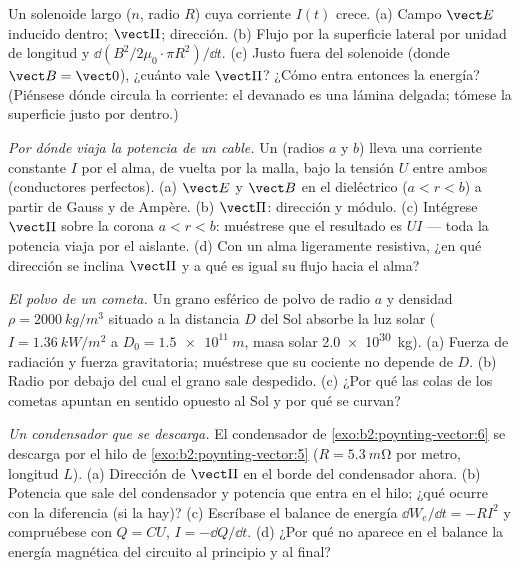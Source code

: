 \begin{exercise}[$\star\star$]\label{exo:b2:poynting-vector:7}
Un solenoide largo ($n$, radio $R$) cuya corriente $I(t)$ crece. (a)
Campo $\vect E$ inducido dentro; $\vect\Pi$; dirección. (b) Flujo por la
superficie lateral por unidad de longitud y $\dd(B^2/2\mu_0\cdot\pi R^2)/\dd t$. (c)
Justo fuera del solenoide (donde $\vect B = \vect 0$), ¿cuánto vale $\vect\Pi$?
¿Cómo entra entonces la energía? (Piénsese dónde circula la corriente: el
devanado es una lámina delgada; tómese la superficie justo por dentro.)
\end{exercise}

\begin{exercise}[$\star\star$]\label{exo:b2:poynting-vector:8}
\emph{Por dónde viaja la potencia de un cable.} Un  (radios $a$
y $b$) lleva una corriente constante $I$ por el alma, de vuelta por la
malla, bajo la tensión $U$ entre ambos (conductores perfectos). (a) $\vect E$ y $\vect B$
en el dieléctrico ($a < r < b$) a partir de Gauss y de Ampère. (b) $\vect\Pi$:
dirección y módulo. (c) Intégrese $\vect\Pi$ sobre la corona $a < r
< b$: muéstrese que el resultado es $UI$ --- toda la potencia viaja por el
aislante. (d) Con un alma ligeramente resistiva, ¿en qué dirección se
inclina $\vect\Pi$ y a qué es igual su flujo hacia el alma?
\end{exercise}

\begin{exercise}[$\star\star$]\label{exo:b2:poynting-vector:9}
\emph{El polvo de un cometa.} Un grano esférico de polvo de radio $a$ y
densidad $\rho = \qty{2000}{kg/m^3}$ situado a la distancia $D$ del Sol
absorbe la luz solar ($I = \qty{1.36}{kW/m^2}$ a $D_0 = \qty{1.5e11}{m}$, masa
solar \qty{2.0e30}{kg}). (a) Fuerza de radiación y fuerza gravitatoria;
muéstrese que su cociente no depende de $D$. (b) Radio por debajo del cual
el grano sale despedido. (c) ¿Por qué las colas de los cometas apuntan en
sentido opuesto al Sol y por qué se curvan?
\end{exercise}

\begin{exercise}[$\star\star\star$]\label{exo:b2:poynting-vector:10}
\emph{Un condensador que se descarga.} El condensador de
\cref{exo:b2:poynting-vector:6} se descarga por el hilo de
\cref{exo:b2:poynting-vector:5} ($R = \qty{5.3}{m\ohm}$ por metro, longitud
$L$). (a) Dirección de $\vect\Pi$ en el borde del condensador ahora. (b) Potencia
que sale del condensador y potencia que entra en el hilo; ¿qué ocurre con
la diferencia (si la hay)? (c) Escríbase el balance de energía $\dd W_e/\dd t = -RI^2$
y compruébese con $Q = CU$, $I = -\dd Q/\dd t$. (d) ¿Por qué no aparece en
el balance la energía magnética del circuito al principio y al final?
\end{exercise}

